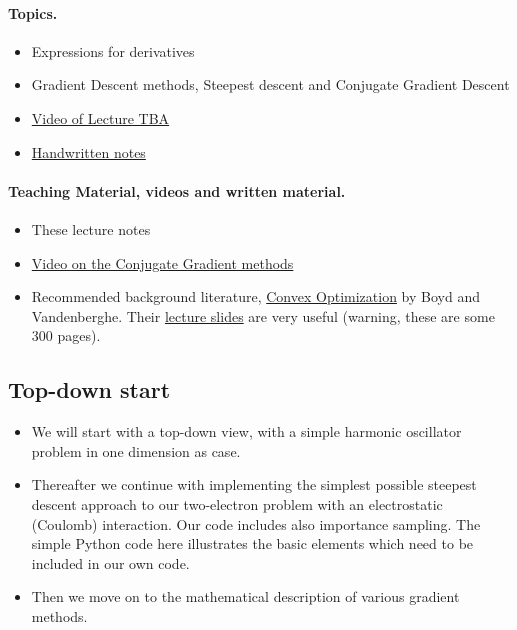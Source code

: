 \documentclass[%
oneside,                 %
final,                   %
10pt]{article}
\begin{document}
\paragraph{Topics.}
\begin{itemize}
\item Expressions for derivatives

\item Gradient Descent methods, Steepest descent and Conjugate Gradient Descent 

\item \href{{https://youtu.be/}}{Video of Lecture TBA}

\item \href{{https://github.com/CompPhysics/ComputationalPhysics2/blob/gh-pages/doc/HandWrittenNotes/2022/NotesFebruary23.pdf}}{Handwritten notes}
\end{itemize}

\noindent




\paragraph{Teaching Material, videos and written material.}
\begin{itemize}
\item These lecture notes

\item \href{{https://www.youtube.com/watch?v=eAYohMUpPMA&ab_channel=TomCarlone}}{Video on the Conjugate Gradient methods}

\item Recommended background literature, \href{{https://web.stanford.edu/~boyd/cvxbook/}}{Convex Optimization} by Boyd and Vandenberghe. Their \href{{https://web.stanford.edu/~boyd/cvxbook/bv_cvxslides.pdf}}{lecture slides} are very useful (warning, these are some 300 pages).
\end{itemize}

\noindent



\subsection*{Top-down start}

\begin{itemize}
\item We will start with a top-down view, with a simple harmonic oscillator problem in one dimension as case.

\item Thereafter we continue with implementing the simplest possible steepest descent approach to our two-electron problem with an electrostatic (Coulomb) interaction. Our code includes also importance sampling. The simple Python code here illustrates the basic elements which need to be included in our own code.

\item Then we move on to the mathematical description of various gradient methods.
\end{itemize}
\end{document}
